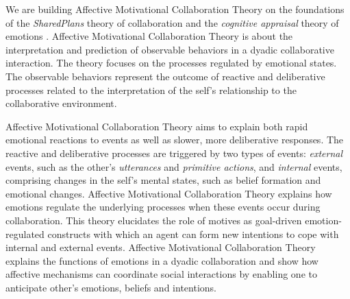 \documentclass[letterpaper]{article}
\begin{document}
We are building Affective Motivational Collaboration Theory on the foundations
of the \textit{SharedPlans} theory of collaboration \cite{grosz:plans-discourse}
and the \textit{cognitive appraisal} theory of emotions
\cite{gratch:domain-independent}. Affective Motivational Collaboration Theory is
about the interpretation and prediction of observable behaviors in a dyadic
collaborative interaction. The theory focuses on the processes regulated by
emotional states. The observable behaviors represent the outcome of reactive and
deliberative processes related to the interpretation of the self's relationship
to the collaborative environment. 

Affective Motivational Collaboration Theory aims to explain both rapid emotional
reactions to events as well as slower, more deliberative responses. The reactive
and deliberative processes are triggered by two types of events:
\textit{external} events, such as the other's \textit{utterances} and
\textit{primitive actions}, and \textit{internal} events, comprising changes in
the self's mental states, such as belief formation and emotional changes.
Affective Motivational Collaboration Theory explains how emotions regulate the
underlying processes when these events occur during collaboration. This theory
elucidates the role of motives as goal-driven emotion-regulated constructs with
which an agent can form new intentions to cope with internal and external
events. Affective Motivational Collaboration Theory explains the functions of
emotions in a dyadic collaboration and show how affective mechanisms can
coordinate social interactions by enabling one to anticipate other's emotions,
beliefs and intentions.
\end{document}
